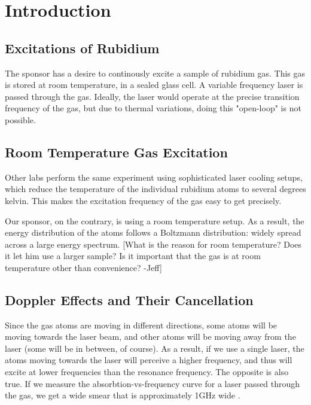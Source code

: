 \newpage
\section{Introduction}

\subsection{Excitations of Rubidium}

The sponsor has a desire to continously excite a sample of rubidium gas.  This gas is stored at room temperature, in a sealed glass cell.  A variable frequency laser is passed through the gas.  Ideally, the laser would operate at the precise transition frequency of the gas, but due to thermal variations, doing this "open-loop" is not possible.

\subsection{Room Temperature Gas Excitation}

Other labs perform the same experiment using sophisticated laser cooling setups, which reduce the temperature of the individual rubidium atoms to several degrees kelvin.  This makes the excitation frequency of the gas easy to get precisely.

Our sponsor, on the contrary, is using a room temperature setup.  As a result, the energy distribution of the atoms follows a Boltzmann distribution: widely spread across a large energy spectrum.  [What is the reason for room temperature?  Does it let him use a larger sample?  Is it important that the gas is at room temperature other than convenience? -Jeff]

\subsection{Doppler Effects and Their Cancellation}

Since the gas atoms are moving in different directions, some atoms will be moving towards the laser beam, and other atoms will be moving away from the laser (some will be in between, of course).  As a result, if we use a single laser, the atoms moving towards the laser will perceive a higher frequency, and thus will excite at lower frequencies than the resonance frequency.  The opposite is also true.  If we measure the absorbtion-vs-frequency curve for a laser passed through the gas, we get a wide smear that is approximately 1GHz wide \cite{madison14}.

